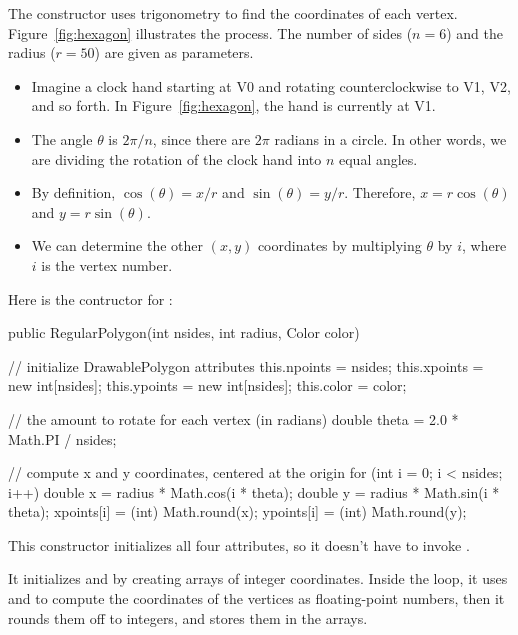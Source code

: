 The constructor uses trigonometry to find the coordinates of each vertex.
Figure~\ref{fig:hexagon} illustrates the process.
The number of sides ($n=6$) and the radius ($r=50$) are given as parameters.

\begin{itemize}

\item Imagine a clock hand starting at V0 and rotating counterclockwise to V1, V2, and so forth.
In Figure~\ref{fig:hexagon}, the hand is currently at V1.

\item The angle $\theta$ is $2 \pi / n$, since there are $2\pi$ radians in a circle.
In other words, we are dividing the rotation of the clock hand into $n$ equal angles.

\item By definition, $\cos(\theta) = x/r$ and $\sin(\theta) = y/r$. Therefore, $x = r \cos(\theta)$ and $y = r \sin(\theta)$.

\item We can determine the other $(x, y)$ coordinates by multiplying $\theta$ by $i$, where $i$ is the vertex number.

\end{itemize}

Here is the contructor for :

\begin{code}
public RegularPolygon(int nsides, int radius, Color color) {

    // initialize DrawablePolygon attributes
    this.npoints = nsides;
    this.xpoints = new int[nsides];
    this.ypoints = new int[nsides];
    this.color = color;

    // the amount to rotate for each vertex (in radians)
    double theta = 2.0 * Math.PI / nsides;

    // compute x and y coordinates, centered at the origin
    for (int i = 0; i < nsides; i++) {
        double x = radius * Math.cos(i * theta);
        double y = radius * Math.sin(i * theta);
        xpoints[i] = (int) Math.round(x);
        ypoints[i] = (int) Math.round(y);
    }
}
\end{code}

This constructor initializes all four attributes, so it doesn't have to invoke .

It initializes  and  by creating arrays of integer coordinates.
Inside the  loop, it uses  and  to compute the coordinates of the vertices as floating-point numbers, then it rounds them off to integers, and stores them in the arrays.

